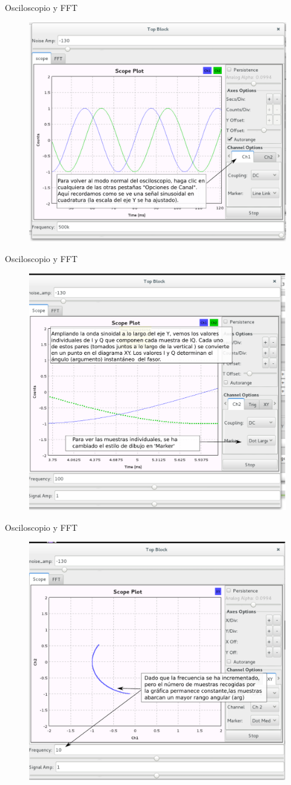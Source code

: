 \begin{frame}{Osciloscopio y FFT}
\begin{figure}[H]
\centering
\includegraphics[width=\textwidth, height=0.58\textwidth]{lab2/pdf/lab215.pdf}
\end{figure}
\end{frame}

\begin{frame}{Osciloscopio y FFT}
\begin{figure}[H]
\centering
\includegraphics[width=\textwidth, height=0.58\textwidth]{lab2/pdf/lab216.pdf}
\end{figure}
\end{frame}

\begin{frame}{Osciloscopio y FFT}
\begin{figure}[H]
\centering
\includegraphics[width=\textwidth, height=0.58\textwidth]{lab2/pdf/lab217.pdf}
\end{figure}
\end{frame}

